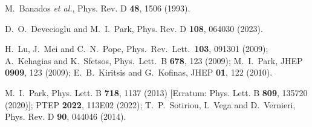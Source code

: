 \documentclass[preprint,aps,tightenlines,showkeys,nofootinbib,superscriptaddress]{revtex4}
\begin{document}
\begin{thebibliography}{999}
M.~Banados \textit{et al.},
Phys. Rev. D \textbf{48}, 1506%
(1993).

D.~O.~Devecioglu and M.~I.~Park,
Phys. Rev. D \textbf{108}, %
064030 (2023).

  H.~Lu, J.~Mei and C.~N.~Pope,
Phys.\ Rev.\ Lett.\  {\bf 103}, 091301 (2009);
  A.~Kehagias and K.~Sfetsos,
Phys.\ Lett.\ B {\bf 678}, 123 (2009);
  M.~I.~Park,
  JHEP {\bf 0909}, 123 (2009);
E.~B.~Kiritsis and G.~Kofinas,
JHEP \textbf{01}, 122 (2010).

M.~I.~Park,
Phys. Lett. B \textbf{718}, 1137
(2013) [Erratum: Phys. Lett. B \textbf{809}, 135720 (2020)];
PTEP \textbf{2022}, %
113E02 (2022);
T.~P.~Sotiriou, I.~Vega and D.~Vernieri,
Phys. Rev. D \textbf{90}, %
044046 (2014).


\end{thebibliography}
\end{document}
